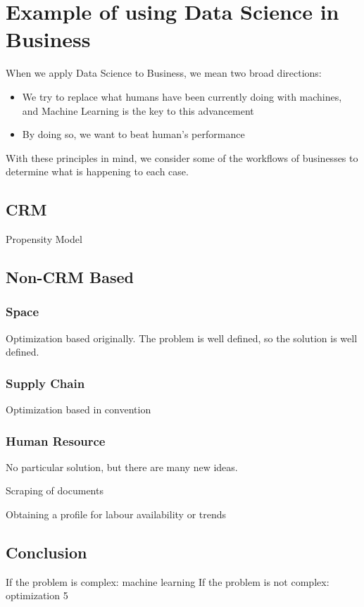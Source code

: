 \section{Example of using Data Science in Business}

When we apply Data Science to Business, we mean two broad directions:

\begin{itemize}
\item We try to replace what humans have been currently doing with machines, and Machine Learning is the key to this advancement
\item By doing so, we want to beat human's performance
\end{itemize}

With these principles in mind, we consider some of the workflows of businesses to determine what is happening to each case.  

\subsection{CRM}

Propensity Model 

\subsection{Non-CRM Based}

\subsubsection{Space}

Optimization based originally.  The problem is well defined, so the solution is well defined.  

\subsubsection{Supply Chain}

Optimization based in convention

\subsubsection{Human Resource}

No particular solution, but there are many new ideas.  

Scraping of documents

Obtaining a profile for labour availability or trends

\subsection{Conclusion}

If the problem is complex: machine learning
If the problem is not complex: optimization  5

\newpage